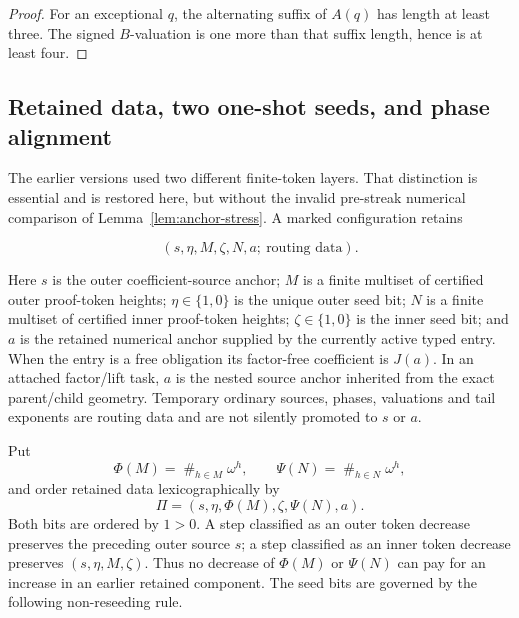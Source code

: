 \documentclass[11pt]{article}
\begin{document}
\begin{proof}
For an exceptional $q$, the alternating suffix of $A(q)$ has length at least
three.  The signed $B$-valuation is one more than that suffix length, hence is
at least four.
\end{proof}

\subsection{Retained data, two one-shot seeds, and phase alignment}

The earlier versions used two different finite-token layers.  That distinction
is essential and is restored here, but without the invalid pre-streak numerical
comparison of Lemma~\ref{lem:anchor-stress}.  A marked configuration retains

\[
  (s,\eta,M,\zeta,N,a;\ \text{routing data}).
\]

Here $s$ is the outer coefficient-source anchor; $M$ is a finite multiset of
certified outer proof-token heights; $\eta\in\{1,0\}$ is the unique outer
seed bit; $N$ is a finite multiset of certified inner proof-token heights;
$\zeta\in\{1,0\}$ is the inner seed bit; and $a$ is the retained numerical
anchor supplied by the currently active typed entry.  When the entry is a
free obligation its factor-free coefficient is $J(a)$.  In an attached
factor/lift task, $a$ is the nested source anchor inherited from the exact
parent/child geometry.  Temporary ordinary sources, phases, valuations and
tail exponents are routing data and are not silently promoted to $s$ or $a$.

Put
\[
 \Phi(M)=\mathop{\#}_{h\in M}\omega^h,
 \qquad
 \Psi(N)=\mathop{\#}_{h\in N}\omega^h,
\]
and order retained data lexicographically by
\begin{equation}\label{eq:v6-rank}
 \boxed{\Pi=(s,\eta,\Phi(M),\zeta,\Psi(N),a).}
\end{equation}
Both bits are ordered by $1>0$.  A step classified as an outer token
decrease preserves the preceding outer source $s$; a step classified as an
inner token decrease preserves $(s,\eta,M,\zeta)$.  Thus no decrease of
$\Phi(M)$ or $\Psi(N)$ can pay for an increase in an earlier retained
component.  The seed bits are governed by the following non-reseeding rule.
\end{document}
